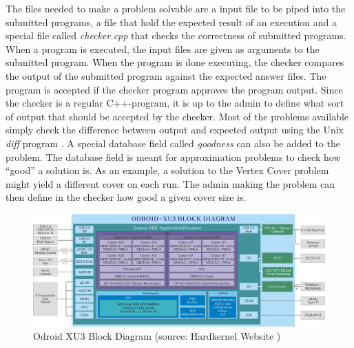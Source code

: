 The files needed to make a problem solvable are a input file to be piped into the submitted programs, a file that hold the expected result of an execution and a special file called \textit{checker.cpp} that checks the correctness of submitted programs. When a program is executed, the input files are given as arguments to the submitted program. When the program is done executing, the checker compares the output of the submitted program against the expected answer files. The program is accepted if the checker program approves the program output. Since the checker is a regular C++-program, it is up to the admin to define what sort of output that should be accepted by the checker. Most of the problems available simply check the difference between output and expected output using the Unix \textit{diff} program \cite{DIFF}. A special database field called \textit{goodness} can also be added to the problem. The database field is meant for approximation problems to check how ``good'' a solution is. As an example, a solution to the Vertex Cover problem might yield a different cover on each run. The admin making the problem can then define in the checker how good a given cover size is.

\begin{figure}
    \includegraphics[width=1.0\textwidth]{figs/block-xu3.jpg}
    \caption[Odroid XU3 Block Diagram]{Odroid XU3 Block Diagram (source: Hardkernel Website \cite{XU3-BLOCK})}
    \label{fig:odroid-block}
\end{figure}

